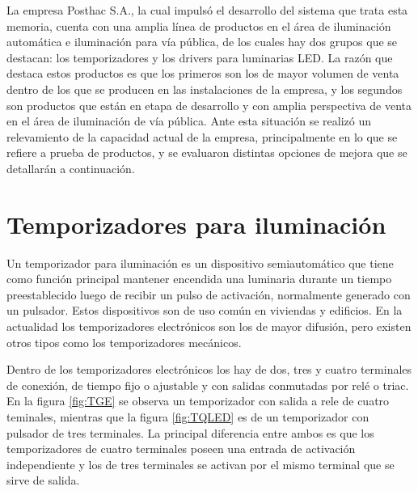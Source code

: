 La empresa Posthac S.A., la cual impulsó el desarrollo del sistema que trata esta memoria, cuenta con una amplia línea de productos en el área de iluminación automática e iluminación para vía pública, de los cuales hay dos grupos que se destacan: los temporizadores y los drivers para luminarias LED. La razón que destaca estos productos es que los primeros son los de mayor volumen de venta dentro de los que se producen en las instalaciones de la empresa, y los segundos son productos que están en etapa de desarrollo y con amplia perspectiva de venta en el área de iluminación de vía pública.
Ante esta situación se realizó un relevamiento de la capacidad actual de la empresa, principalmente en lo que se refiere a prueba de productos, y se evaluaron distintas opciones de mejora que se detallarán a continuación.


\section{Temporizadores para iluminación}

Un temporizador para iluminación es un dispositivo semiautomático que tiene como función principal mantener encendida una luminaria durante un tiempo preestablecido luego de recibir un pulso de activación, normalmente generado con un pulsador. Estos dispositivos son de uso común en viviendas y edificios. En la actualidad los temporizadores electrónicos son los de mayor difusión, pero existen otros tipos como los temporizadores mecánicos.

Dentro de los temporizadores electrónicos los hay de dos, tres y cuatro terminales de conexión, de tiempo fijo o ajustable y con salidas conmutadas por relé o triac. En la figura \ref{fig:TGE} se observa un temporizador con salida a rele de cuatro teminales, mientras que la figura \ref{fig:TQLED} es de un temporizador con pulsador de tres terminales. La principal diferencia entre ambos es que los temporizadores de cuatro terminales poseen una entrada de activación independiente y los de tres terminales se activan por el mismo terminal que se sirve de salida.

